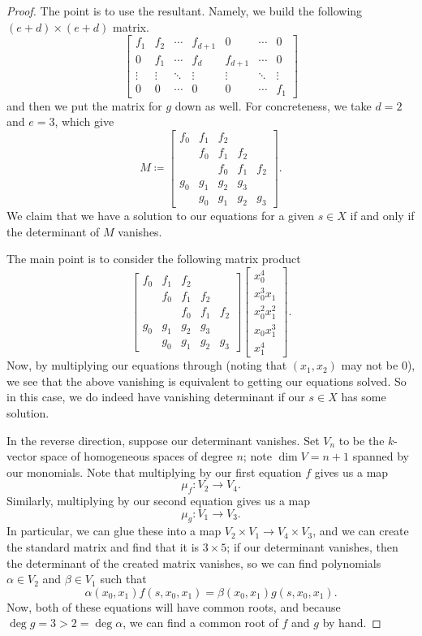 \begin{proof}
	The point is to use the resultant. Namely, we build the following $(e+d)\times(e+d)$ matrix.
	\[\begin{bmatrix}
		f_1 & f_2 & \cdots & f_{d+1} & 0 & \cdots & 0 \\
		0 & f_1 & \cdots & f_d & f_{d+1} & \cdots & 0 \\
		\vdots & \vdots & \ddots & \vdots & \vdots & \ddots & \vdots \\
		0 & 0 & \cdots & 0 & 0 & \cdots & f_1
	\end{bmatrix}\]
	and then we put the matrix for $g$ down as well. For concreteness, we take $d=2$ and $e=3$, which give
	\[M\coloneqq\begin{bmatrix}
		f_0 & f_1 & f_2 \\
		    & f_0 & f_1 & f_2 \\
			&     & f_0 & f_1 & f_2 \\
		g_0 & g_1 & g_2 & g_3 \\
		    & g_0 & g_1 & g_2 & g_3
	\end{bmatrix}.\]
	We claim that we have a solution to our equations for a given $s\in X$ if and only if the determinant of $M$ vanishes.

	The main point is to consider the following matrix product
	\[\begin{bmatrix}
		f_0 & f_1 & f_2 \\
		    & f_0 & f_1 & f_2 \\
			&     & f_0 & f_1 & f_2 \\
		g_0 & g_1 & g_2 & g_3 \\
		    & g_0 & g_1 & g_2 & g_3
	\end{bmatrix}\begin{bmatrix}
		x_0^4 \\
		x_0^3x_1 \\
		x_0^2x_1^2 \\
		x_0x_1^3 \\
		x_1^4
	\end{bmatrix}.\]
	Now, by multiplying our equations through (noting that $(x_1,x_2)$ may not be $0$), we see that the above vanishing is equivalent to getting our equations solved. So in this case, we do indeed have vanishing determinant if our $s\in X$ has some solution.

	In the reverse direction, suppose our determinant vanishes. Set $V_n$ to be the $k$-vector space of homogeneous spaces of degree $n$; note $\dim V=n+1$ spanned by our monomials. Note that multiplying by our first equation $f$ gives us a map
	\[\mu_f\colon V_2\to V_4.\]
	Similarly, multiplying by our second equation gives us a map
	\[\mu_g\colon V_1\to V_3.\]
	In particular, we can glue these into a map $V_2\times V_1\to V_4\times V_3$, and we can create the standard matrix and find that it is $3\times 5$; if our determinant vanishes, then the determinant of the created matrix vanishes, so we can find polynomials $\alpha\in V_2$ and $\beta\in V_1$ such that
	\[\alpha(x_0,x_1)f(s,x_0,x_1)=\beta(x_0,x_1)g(s,x_0,x_1).\]
	Now, both of these equations will have common roots, and because $\deg g=3>2=\deg\alpha$, we can find a common root of $f$ and $g$ by hand.
\end{proof}

